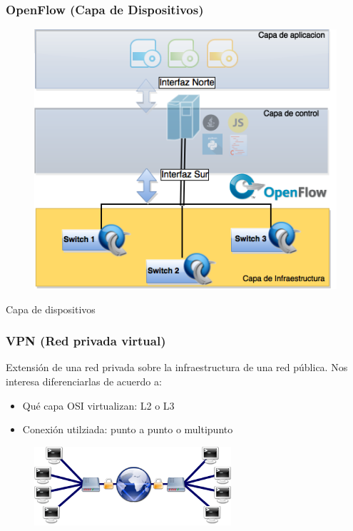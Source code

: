 \documentclass{beamer}
\begin{document}
\begin{frame}
\frametitle{OpenFlow (Capa de Dispositivos)} 
\begin{minipage}{0.40\textwidth}
	\begin{figure}[H]
		\centering
		\includegraphics[width=1.0\textwidth]{imagenes/openflowDevices.png}
	\end{figure}

\end{minipage}
\hfill
\begin{minipage}{0.58\textwidth}
Capa de dispositivos
\end{minipage}

\end{frame}

\begin{frame}
\frametitle{VPN (Red privada virtual)} 
Extensión de una red privada sobre la infraestructura de una red pública. Nos interesa diferenciarlas de acuerdo a:
\begin{itemize}
\item Qu\'e capa OSI virtualizan: L2 o L3
\item Conexi\'on utilziada: punto a punto o multipunto
\end{itemize}
	
\vspace{0.4cm}
\begin{figure}[H]
\centering
\includegraphics[width=0.65\textwidth]{imagenes/vpn.png}
\end{figure}

\end{frame}
\end{document}

